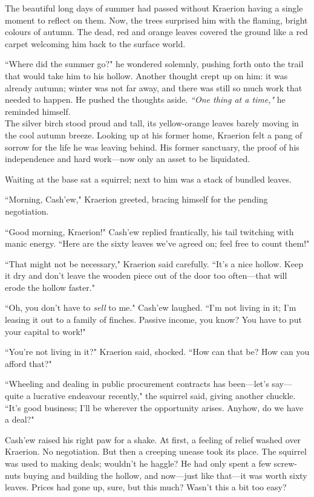 The beautiful long days of summer had passed without Kraerion having a single moment to reflect on them.
Now, the trees surprised him with the flaming, bright colours of autumn.
The dead, red and orange leaves covered the ground like a red carpet welcoming him back to the surface world.

``Where did the summer go?" he wondered solemnly, pushing forth onto the trail that would take him to his hollow.
Another thought crept up on him: it was already autumn; winter was not far away, and there was still so much work that needed to happen.
He pushed the thoughts aside. \textit{``One thing at a time,"} he reminded himself.\\

The silver birch stood proud and tall, its yellow-orange leaves barely moving in the cool autumn breeze.
Looking up at his former home, Kraerion felt a pang of sorrow for the life he was leaving behind.
His former sanctuary, the proof of his independence and hard work---now only an asset to be liquidated.

Waiting at the base sat a squirrel; next to him was a stack of bundled leaves.

``Morning, Cash'ew," Kraerion greeted, bracing himself for the pending negotiation.

``Good morning, Kraerion!" Cash'ew replied frantically, his tail twitching with manic energy.
``Here are the sixty leaves we've agreed on; feel free to count them!"

``That might not be necessary," Kraerion said carefully.
``It's a nice hollow.
Keep it dry and don't leave the wooden piece out of the door too often---that will erode the hollow faster."

``Oh, you don't have to \textit{sell} to me." Cash'ew laughed.
``I'm not living in it; I'm leasing it out to a family of finches.
Passive income, you know?
You have to put your capital to work!"

``You're not living in it?" Kraerion said, shocked. ``How can that be?
How can you afford that?"

``Wheeling and dealing in public procurement contracts has been---let's say---quite a lucrative endeavour recently," the squirrel said, giving another chuckle.
``It's good business; I'll be wherever the opportunity arises.
Anyhow, do we have a deal?"

Cash'ew raised his right paw for a shake.
At first, a feeling of relief washed over Kraerion. No negotiation.
But then a creeping unease took its place.
The squirrel was used to making deals; wouldn't he haggle?
He had only spent a few screw-nuts buying and building the hollow, and now---just like that---it was worth sixty leaves.
Prices had gone up, sure, but this much? Wasn't this a bit too easy?

